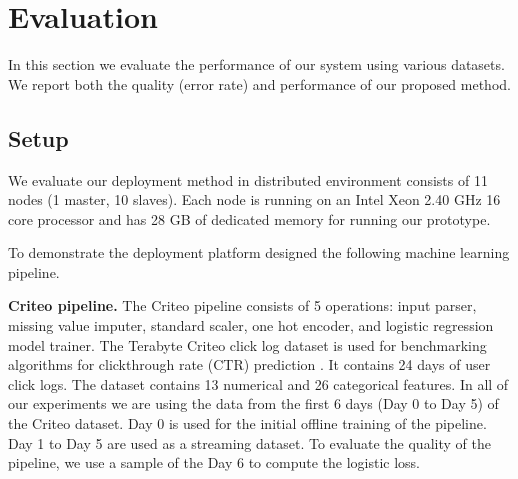 \section{Evaluation} \label{evaluation} 
In this section we evaluate the performance of our system using various datasets. 
We report both the quality (error rate) and performance of our proposed method. 

\subsection{Setup}\label{subsec:setup}
We evaluate our deployment method in distributed environment consists of 11 nodes (1 master, 10 slaves).
Each node is running on an Intel Xeon 2.40 GHz 16 core processor and has 28 GB of dedicated memory for running our prototype.

To demonstrate the deployment platform designed the following machine learning pipeline.

\textbf{Criteo pipeline.} 
The Criteo pipeline consists of 5 operations: input parser, missing value imputer, standard scaler, one hot encoder, and logistic regression model trainer. 
The Terabyte Criteo click log dataset is used for benchmarking algorithms for clickthrough rate (CTR) prediction \cite{criteo-log}.
It contains 24 days of user click logs. 
The dataset  contains 13 numerical and 26 categorical features. 
In all of our experiments we are using the data from the first 6 days (Day 0 to Day 5) of the Criteo dataset.
Day 0 is used for the initial offline training of the pipeline.
Day 1 to Day 5 are used as a streaming dataset.
To evaluate the quality of the pipeline, we use a sample of the Day 6 to compute the logistic loss.

